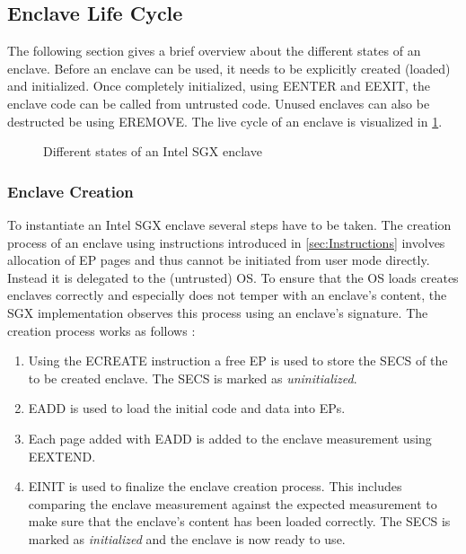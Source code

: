 \subsection{Enclave Life Cycle}
The following section gives a brief overview about the different states of an enclave. Before an enclave can be used, it needs to be explicitly created (loaded) and initialized.
Once completely initialized, using EENTER and EEXIT, the enclave code can be called from untrusted code. Unused enclaves can also be destructed be using EREMOVE. The live cycle 
of an enclave is visualized in \cref{fig:enclaveLifeCycle}.

\begin{figure}[h]
    \centering
    \caption{Different states of an Intel SGX enclave \cite{Costan2016IntelSE}}
    \label{fig:enclaveLifeCycle}
\end{figure}

\subsubsection{Enclave Creation}
To instantiate an Intel SGX enclave several steps have to be taken. The creation process of an enclave using instructions introduced in \cref{sec:Instructions} involves allocation
of EP pages and thus cannot be initiated from user mode directly. Instead it is delegated to the (untrusted) OS. To ensure that the OS loads creates enclaves correctly and
especially does not temper with an enclave's content, the SGX implementation observes this process using an enclave's signature. The creation process works as follows
\cite{Costan2016IntelSE}:
\begin{enumerate}
    \item Using the ECREATE instruction a free EP is used to store the SECS of the to be created enclave. The SECS is marked as \textit{uninitialized}.
    \item EADD is used to load the initial code and data into EPs.
    \item Each page added with EADD is added to the enclave measurement using EEXTEND.
    \item EINIT is used to finalize the enclave creation process. This includes comparing the enclave measurement against the expected measurement to make sure that the enclave's
          content has been loaded correctly. The SECS is marked as \textit{initialized} and the enclave is now ready to use.
\end{enumerate}

